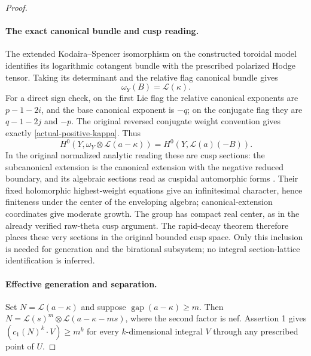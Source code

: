 \begin{proof}
\paragraph{The exact canonical bundle and cusp reading.}
The extended Kodaira--Spencer isomorphism on the constructed
toroidal model identifies its logarithmic cotangent bundle with
the prescribed polarized Hodge tensor\cite[Theorem 6.4.1.1(4)]{positive-lan-pel}.
Taking its determinant and the relative flag canonical bundle gives
\begin{equation}\label{actual-positive-canonical}
                 \omega_Y(B)=\mathcal L(\kappa).
\end{equation}
For a direct sign check, on the first Lie flag the relative
canonical exponents are $p-1-2i$, and the base canonical exponent
is $-q$; on the conjugate flag they are $q-1-2j$ and $-p$.
The original reversed conjugate weight convention gives exactly
\eqref{actual-positive-kappa}. Thus
\[
 H^0(Y,\omega_Y\otimes\mathcal L(a-\kappa))
                =H^0(Y,\mathcal L(a)(-B)).
\]
In the original normalized analytic reading these are cusp
sections: the subcanonical extension is the canonical extension
with the negative reduced boundary, and its algebraic sections
read as cuspidal automorphic forms
\cite{positive-lan-analytic,positive-lan-stroh}.
Their fixed holomorphic highest-weight equations give an
infinitesimal character, hence finiteness under the center of
the enveloping algebra; canonical-extension
coordinates give moderate growth. The group has compact real
center, as in the already verified raw-theta cusp argument.
The rapid-decay theorem therefore places these very sections
in the original bounded cusp space\cite{positive-cusp-decay}.
Only this inclusion is needed for generation and the birational
subsystem; no integral section-lattice identification is inferred.

\paragraph{Effective generation and separation.}
Set $N=\mathcal L(a-\kappa)$ and suppose
$\operatorname{gap}(a-\kappa)\ge m$. Then
$N=\mathcal L(s)^m\otimes\mathcal L(a-\kappa-ms)$,
where the second factor is nef. Assertion 1 gives
$(c_1(N)^k\cdot V)\ge m^k$ for every $k$-dimensional
integral $V$ through any prescribed point of $U$.


\end{proof}
